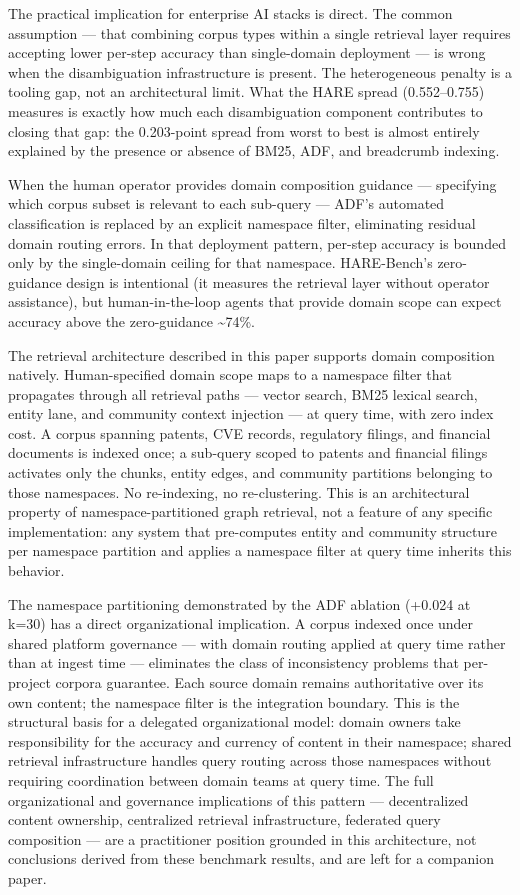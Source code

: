 \documentclass[
]{article}
\begin{document}
The practical implication for enterprise AI stacks is direct. The common
assumption --- that combining corpus types within a single retrieval
layer requires accepting lower per-step accuracy than single-domain
deployment --- is wrong when the disambiguation infrastructure is
present. The heterogeneous penalty is a tooling gap, not an
architectural limit. What the HARE spread (0.552--0.755) measures is
exactly how much each disambiguation component contributes to closing
that gap: the 0.203-point spread from worst to best is almost entirely
explained by the presence or absence of BM25, ADF, and breadcrumb
indexing.

When the human operator provides domain composition guidance ---
specifying which corpus subset is relevant to each sub-query --- ADF's
automated classification is replaced by an explicit namespace filter,
eliminating residual domain routing errors. In that deployment pattern,
per-step accuracy is bounded only by the single-domain ceiling for that
namespace. HARE-Bench's zero-guidance design is intentional (it measures
the retrieval layer without operator assistance), but human-in-the-loop
agents that provide domain scope can expect accuracy above the
zero-guidance \textasciitilde74\%.

The retrieval architecture described in this paper supports domain
composition natively. Human-specified domain scope maps to a namespace
filter that propagates through all retrieval paths --- vector search,
BM25 lexical search, entity lane, and community context injection --- at
query time, with zero index cost. A corpus spanning patents, CVE
records, regulatory filings, and financial documents is indexed once; a
sub-query scoped to patents and financial filings activates only the
chunks, entity edges, and community partitions belonging to those
namespaces. No re-indexing, no re-clustering. This is an architectural
property of namespace-partitioned graph retrieval, not a feature of any
specific implementation: any system that pre-computes entity and
community structure per namespace partition and applies a namespace
filter at query time inherits this behavior.

The namespace partitioning demonstrated by the ADF ablation (+0.024 at
k=30) has a direct organizational implication. A corpus indexed once
under shared platform governance --- with domain routing applied at
query time rather than at ingest time --- eliminates the class of
inconsistency problems that per-project corpora guarantee. Each source
domain remains authoritative over its own content; the namespace filter
is the integration boundary. This is the structural basis for a
delegated organizational model: domain owners take responsibility for
the accuracy and currency of content in their namespace; shared
retrieval infrastructure handles query routing across those namespaces
without requiring coordination between domain teams at query time. The
full organizational and governance implications of this pattern ---
decentralized content ownership, centralized retrieval infrastructure,
federated query composition --- are a practitioner position grounded in
this architecture, not conclusions derived from these benchmark results,
and are left for a companion paper.
\end{document}
